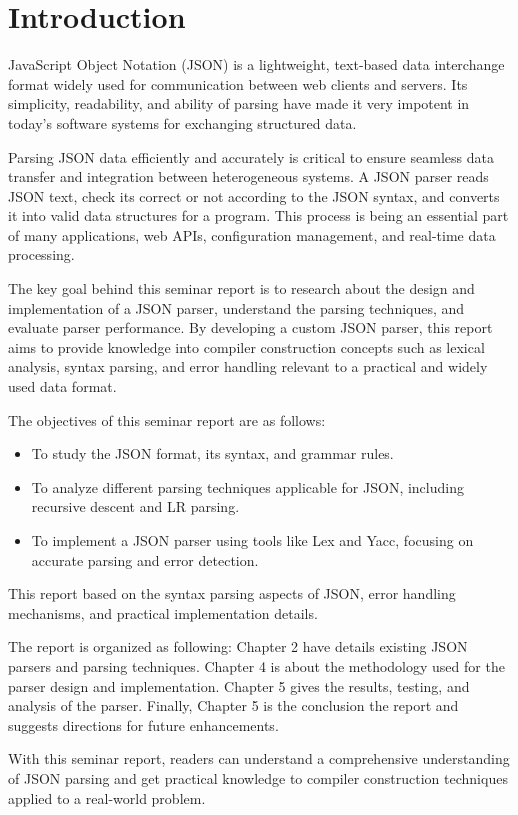 \chapter{Introduction}

JavaScript Object Notation (JSON) is a lightweight, text-based data interchange format widely used for communication between web clients and servers. Its simplicity, readability, and ability of parsing have made it very impotent in today's software systems for exchanging structured data.

Parsing JSON data efficiently and accurately is critical to ensure seamless data transfer and integration between heterogeneous systems. A JSON parser reads JSON text, check its correct or not according to the JSON syntax, and converts it into valid data structures for a program. This process is being an essential part of many applications, web APIs, configuration management, and real-time data processing.

The key goal behind this seminar report is to research about the design and implementation of a JSON parser, understand the parsing techniques, and evaluate parser performance. By developing a custom JSON parser, this report aims to provide knowledge into compiler construction concepts such as lexical analysis, syntax parsing, and error handling relevant to a practical and widely used data format.

The objectives of this seminar report are as follows:
\begin{itemize}
	\item To study the JSON format, its syntax, and grammar rules.
	\item To analyze different parsing techniques applicable for JSON, including recursive descent and LR parsing.
	\item To implement a JSON parser using tools like Lex and Yacc, focusing on accurate parsing and error detection.
\end{itemize}

This report based on the syntax parsing aspects of JSON, error handling mechanisms, and practical implementation details. 

The report is organized as following: Chapter 2 have details existing JSON parsers and parsing techniques. Chapter 4 is about the methodology used for the parser design and implementation. Chapter 5 gives the results, testing, and analysis of the parser. Finally, Chapter 5 is the conclusion  the report and suggests directions for future enhancements.

With this seminar report, readers can understand a comprehensive understanding of JSON parsing and get practical knowledge to compiler construction techniques applied to a real-world problem.
